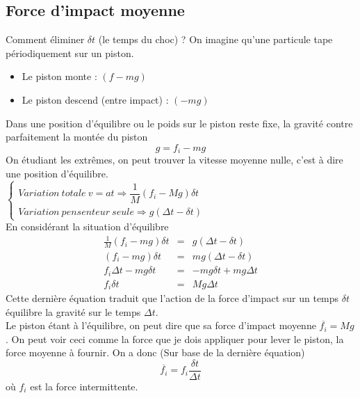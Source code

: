 \documentclass	[11pt, a4paper, openany]{book}
\begin{document}
\subsection{Force d'impact moyenne}
Comment éliminer $\delta t$ (le temps du choc) ? On imagine qu'une particule tape périodiquement sur un piston.
\begin{itemize}
\item Le piston monte : $(f - mg)$
\item Le piston descend (entre impact) : $(-mg)$
\end{itemize}
Dans une position d'équilibre ou le poids sur le piston reste fixe, la gravité contre parfaitement la montée du piston 
\begin{equation}
g = f_i - mg
\end{equation}
On étudiant les extrêmes, on peut trouver la vitesse moyenne nulle, c'est à dire une position d'équilibre.\\
$\left\{\begin{array}{l}
Variation\ totale\ v = at  \Rightarrow \dfrac{1}{M}\left(f_i - Mg\right)\delta t\\
Variation\ pensenteur\ seule  \Rightarrow g(\Delta t -  \delta t)
\end{array}\right.$\\
En considérant la situation d'équilibre
\begin{eqnarray}
\frac{1}{M}(f_i - mg)\delta t &=& g(\Delta t - \delta t)\\
(f_i - mg)\delta t &=& mg(\Delta t - \delta t)\\
f_i\Delta t - mg\delta t &=& - mg\delta t + mg \Delta t\\
f_i \delta t &=& Mg\Delta t
\end{eqnarray}
Cette dernière équation traduit que l'action de la force d'impact sur un temps $\delta t$ équilibre la gravité sur le temps $\Delta t$.\\

Le piston étant à l'équilibre, on peut dire que sa force d'impact moyenne $\overline{f_i} = Mg$. On peut voir ceci comme la force que je dois appliquer pour lever le piston, la force moyenne à fournir.  On a donc (Sur base de la dernière équation)
\begin{equation}
\overline{f_i} = f_i \frac{\delta t}{\Delta t}
\end{equation}
où $f_i$ est la force intermittente.
\end{document}
